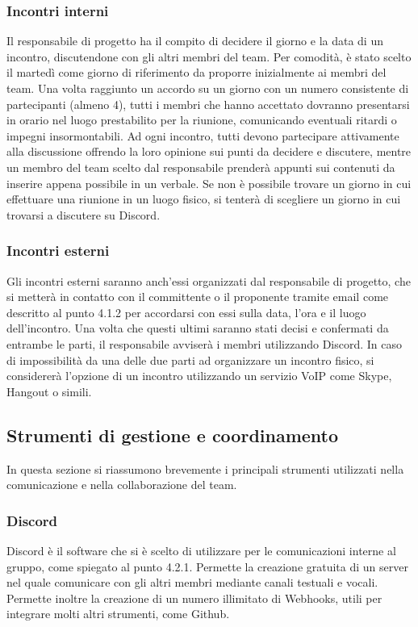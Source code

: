 \subsubsection{Incontri interni}
Il responsabile di progetto ha il compito di decidere il giorno e la data di un incontro, discutendone con gli altri membri del team. Per comodità, è stato scelto il martedì come giorno di riferimento da proporre inizialmente ai membri del team.
\newline
Una volta raggiunto un accordo su un giorno con un numero consistente di partecipanti (almeno 4), tutti i membri che hanno accettato dovranno presentarsi in orario nel luogo prestabilito per la riunione, comunicando eventuali ritardi o impegni insormontabili.
Ad ogni incontro, tutti devono partecipare attivamente alla discussione offrendo la loro opinione sui punti da decidere e discutere, mentre un membro del team scelto dal responsabile prenderà appunti sui contenuti da inserire appena possibile in un verbale.
\newline
Se non è possibile trovare un giorno in cui effettuare una riunione in un luogo fisico, si tenterà di scegliere un giorno in cui trovarsi a discutere su Discord.

\subsubsection{Incontri esterni}
Gli incontri esterni saranno anch'essi organizzati dal responsabile di progetto, che si metterà in contatto con il committente o il proponente tramite email come descritto al punto 4.1.2 per accordarsi con essi sulla data, l'ora e il luogo dell'incontro. Una volta che questi ultimi saranno stati decisi e confermati da entrambe le parti, il responsabile avviserà i membri utilizzando Discord.
In caso di impossibilità da una delle due parti ad organizzare un incontro fisico, si considererà l'opzione di un incontro utilizzando un servizio VoIP come Skype, Hangout o simili.

\subsection{Strumenti di gestione e coordinamento}
In questa sezione si riassumono brevemente i principali strumenti utilizzati nella comunicazione e nella collaborazione del team.

\subsubsection{Discord}
Discord è il software che si è scelto di utilizzare per le comunicazioni interne al gruppo, come spiegato al punto 4.2.1. Permette la creazione gratuita di un server nel quale comunicare con gli altri membri mediante canali testuali e vocali. Permette inoltre la creazione di un numero illimitato di Webhooks, utili per integrare molti altri strumenti, come Github.

